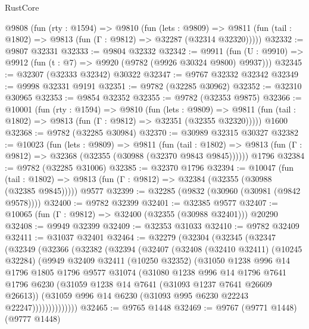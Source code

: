 \begin{lexlean}{RustCore}
\begin{coremodule}
  @9808
    (fun (rty : @1594) =>
    @9810
      (fun (lets : @9809) =>
      @9811 (fun (tail : @1802) => @9813 (fun (Γ : @9812) => @32287 (@32314 @32320)))))
@32332 := @9807 @32331
@32333 := @9804 @32332
@32342 := @9911
    (fun (U : @9910) => @9912 (fun (t : @7) => @9920 (@9782 (@9926 @30324 @9800) @9937)))
@32345 := @32307 (@32333 @32342) @30322
@32347 := @9767 @32332 @32342
@32349 := @9998 @32331 @9191
@32351 := @9782 (@32285 @30962)
@32352 := @32310 @30965
@32353 := @9854 @32352
@32355 := @9782 (@32353 @9875)
@32366 := @10001
    (fun (rty : @1594) =>
    @9810
      (fun (lets : @9809) =>
      @9811 (fun (tail : @1802) => @9813 (fun (Γ : @9812) => @32351 (@32355 @32320)))))
    @1600
@32368 := @9782 (@32285 @30984)
@32370 := @30989 @32315 @30327
@32382 := @10023
    (fun (lets : @9809) =>
    @9811
      (fun (tail : @1802) =>
      @9813 (fun (Γ : @9812) => @32368 (@32355 (@30988 (@32370 @9843 @9845))))))
    @1796
@32384 := @9782 (@32285 @31006)
@32385 := @32370 @1796
@32394 := @10047
    (fun (tail : @1802) => @9813 (fun (Γ : @9812) => @32384 (@32355 (@30988 (@32385 @9845)))))
    @9577
@32399 := @32285 (@9832 (@30960 (@30981 (@9842 @9578))))
@32400 := @9782 @32399
@32401 := @32385 @9577
@32407 := @10065 (fun (Γ : @9812) => @32400 (@32355 (@30988 @32401))) @20290
@32408 := @9949 @32399
@32409 := @32353 @31033
@32410 := @9782 @32409
@32411 := @31037 @32401
@32464 := @32279
    (@32304
      (@32345
        (@32347
          (@32349
            (@32366
              (@32382
                (@32394
                  (@32407
                    (@32408
                      (@32410 @32411)
                      (@10245 @32284)
                      (@9949
                        @32409
                        @32411
                        (@10250 @32352)
                        (@31050
                          @1238
                          @996
                          @14
                          @1796
                          @1805
                          @1796
                          @9577
                          @31074
                          (@31080
                            @1238
                            @996
                            @14
                            @1796
                            @7641
                            @1796
                            @6230
                            (@31059 @1238 @14 @7641 (@31093 @1237 @7641 @26609 @26613))
                            (@31059 @996 @14 @6230 (@31093 @995 @6230 @22243 @22247))))))))))))))
@32465 := @9765 @1448
@32469 := @9767 (@9771 @1448) (@9777 @1448)

\end{coremodule}
\end{lexlean}
